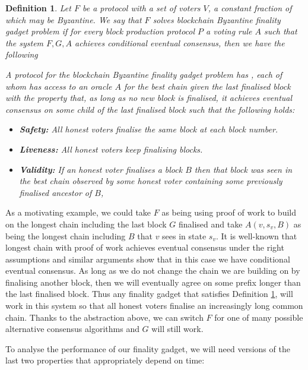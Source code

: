 \documentclass{article}
\newtheorem{definition}[theorem]{Definition}
\begin{document}
\begin{definition} \label{def:finality-gadget} 
Let $F$ be a protocol  with a set of voters $V$, a constant fraction of which may be Byzantine.
We say that $F$ solves {\em blockchain Byzantine finality gadget problem} if for every block production protocol $P$ a voting rule $A$ such that the system $F,G,A$ achieves conditional eventual consensus, then we have the following

A protocol for the blockchain Byzantine finality gadget problem has , each of whom has access to an oracle $A$ for the best chain given the last finalised block with the property that, as long as no new block is finalised, it achieves eventual consensus on some child of the last finalised block such that the following holds:

\begin{itemize}
\item{\bf Safety:} All honest voters finalise the same block at each block number.
\item{\bf Liveness:} All honest voters keep finalising blocks.
\item{\bf Validity:} If an honest voter finalises a block $B$ then that block was seen in the best chain observed by some honest voter containing some previously finalised ancestor of $B$,
\end{itemize}

\end{definition}

As a motivating example, we could take $F$ as being using proof of work to build on the longest chain including the last block $G$ finalised and take $A(v,s_v,B)$ as being the longest chain including $B$ that $v$ sees in state $s_v$. It is well-known \cite{bitcoinpapers} that longest chain with proof of work achieves eventual consensus under the right assumptions and similar arguments show that in this case we have conditional eventual consensus.
As long as we do not change the chain we are building on by finalising another block, then we will eventually agree on some prefix longer than the last finalised block.
Thus any finality gadget that satisfies Definition \ref{def:finality-gadget}, will work in this system so that all honest voters finalise an increasingly long common chain.
Thanks to the abstraction above, we can switch $F$ for one of many possible alternative consensus algorithms and $G$ will still work.


To analyse the performance of our finality gadget, we will need versions of the last two properties that appropriately depend on time: 
\end{document}
